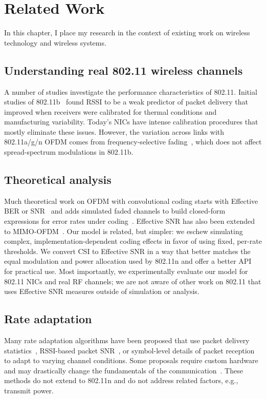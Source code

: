 \ifx\mainfile\undefined

\setcounter{chapter}{8} %
\fi

\cleardoublepage
\chapter{Related Work}
\label{chap:related}

In this chapter, I place my research in the context of existing work on wireless technology and wireless systems.

\section{Understanding real 802.11 wireless channels}
A number of studies investigate the performance characteristics of 802.11. Initial studies of 802.11b~\cite{Aguayo_Roofnet,Reis_interference} found RSSI to be a weak predictor of packet delivery that improved when receivers were calibrated for thermal conditions and manufacturing variability. Today's NICs have intense calibration procedures that mostly eliminate these issues. However, the variation across links with 802.11a/g/n OFDM comes from frequency-selective fading~\cite{Lampe_adaptation, Tse}, which does not affect spread-spectrum modulations in 802.11b.

\section{Theoretical analysis}
Much theoretical work on OFDM with convolutional coding starts with Effective BER or SNR~\cite{Nanda_EffectiveSNR} and adds simulated faded channels to build closed-form expressions for error rates under coding~\cite{Tobagi_ofdm,Nortel_3g,Tralli_convolutional}. Effective SNR has also been extended to MIMO-OFDM~\cite{Liu_EESM,Martorell_11n}. Our model is related, but simpler: we eschew simulating complex, implementation-dependent coding effects in favor of using fixed, per-rate thresholds. We convert CSI to Effective SNR in a way that better matches the equal modulation and power allocation used by 802.11n and offer a better API for practical use. Most importantly, we experimentally evaluate our model for 802.11 NICs and real RF channels; we are not aware of other work on 802.11 that uses Effective SNR measures outside of simulation or analysis.

\section{Rate adaptation}
Many rate adaptation algorithms have been proposed that use packet delivery statistics~\cite{Bicket_SampleRate,Wong_RRAA}, RSSI-based packet SNR~\cite{Camp_rateadapt,Judd_CHARM}, or symbol-level details of packet reception~\cite{Sen_AccuRate,Vutukuru_SoftRate} to adapt to varying channel conditions. Some proposals require custom hardware~\cite{Camp_rateadapt} and may drastically change the fundamentals of the communication~\cite{Rahul_FARA}. These methods do not extend to 802.11n and do not address related factors, e.g., transmit power.

